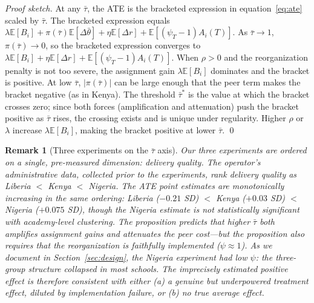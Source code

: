 \documentclass[11pt]{article}
\newtheorem{remark}{Remark}
\newcommand{\E}{\mathbb{E}}
\begin{document}
\noindent \emph{Proof sketch.} At any $\bar{\tau}$, the ATE is the bracketed expression in equation~\eqref{eq:ate} scaled by $\bar{\tau}$. The bracketed expression equals $\lambda\E[B_i] + \pi(\bar{\tau})\E[\Delta\bar{\theta}] + \eta\E[\Delta r] + \E[(\psi_T - 1)A_i(T)]$. As $\bar{\tau} \to 1$, $\pi(\bar{\tau}) \to 0$, so the bracketed expression converges to $\lambda\E[B_i] + \eta\E[\Delta r] + \E[(\psi_T - 1)A_i(T)]$. When $\rho > 0$ and the reorganization penalty is not too severe, the assignment gain $\lambda\E[B_i]$ dominates and the bracket is positive. At low $\bar{\tau}$, $|\pi(\bar{\tau})|$ can be large enough that the peer term makes the bracket negative (as in Kenya). The threshold $\bar{\tau}^*$ is the value at which the bracket crosses zero; since both forces (amplification and attenuation) push the bracket positive as $\bar{\tau}$ rises, the crossing exists and is unique under regularity. Higher $\rho$ or $\lambda$ increase $\lambda\E[B_i]$, making the bracket positive at lower $\bar{\tau}$. \qed

\begin{remark}[Three experiments on the $\bar{\tau}$ axis]
\label{rem:three_expts}
Our three experiments are ordered on a single, pre-measured dimension: delivery quality. The operator's administrative data, collected prior to the experiments, rank delivery quality as Liberia $<$ Kenya $<$ Nigeria. The ATE point estimates are monotonically increasing in the same ordering: Liberia ($-0.21$ SD) $<$ Kenya ($+0.03$ SD) $<$ Nigeria ($+0.075$ SD), though the Nigeria estimate is not statistically significant with academy-level clustering. The proposition predicts that higher $\bar{\tau}$ both amplifies assignment gains and attenuates the peer cost---but the proposition also requires that the reorganization is faithfully implemented ($\psi \approx 1$). As we document in Section~\ref{sec:design}, the Nigeria experiment had low $\psi$: the three-group structure collapsed in most schools. The imprecisely estimated positive effect is therefore consistent with either (a) a genuine but underpowered treatment effect, diluted by implementation failure, or (b) no true average effect.
\end{remark}
\end{document}
